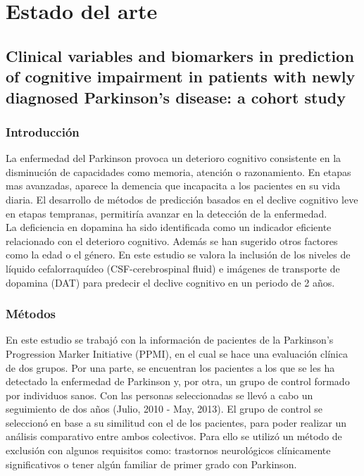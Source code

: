\chapter{Estado del arte}



\section{Clinical variables and biomarkers in prediction of cognitive impairment in patients with newly diagnosed Parkinson’s disease: a cohort study}


	\subsection{Introducción}
	
	La enfermedad del Parkinson provoca un deterioro cognitivo consistente en la disminución de capacidades como memoria, atención o razonamiento. En etapas mas avanzadas, aparece la demencia que incapacita a los pacientes en su vida diaria. El desarrollo de métodos de predicción basados en el declive cognitivo leve en etapas tempranas, permitiría avanzar en la detección de la enfermedad. \\
	
	
	La deficiencia en dopamina ha sido identificada como un indicador eficiente relacionado con el deterioro cognitivo. Además se han sugerido otros factores como la edad o el género. En este estudio se valora la inclusión de los niveles de líquido cefalorraquídeo (CSF-cerebrospinal fluid) e imágenes de transporte de dopamina (DAT) para predecir el declive cognitivo en un periodo de 2 años.
	
	\subsection{Métodos}
	En este estudio se trabajó con la información de pacientes de la Parkinson’s Progression Marker Initiative (PPMI), en el cual se hace una evaluación clínica de dos grupos. Por una parte, se encuentran los pacientes a los que se les ha detectado la enfermedad de Parkinson y, por otra, un grupo de control formado por individuos sanos. Con las personas seleccionadas se llevó a cabo un seguimiento de dos años (Julio, 2010 - May, 2013). El grupo de control se seleccionó en base a su similitud con el de los pacientes, para poder realizar un análisis comparativo entre ambos colectivos. Para ello se utilizó un método de exclusión con algunos requisitos como: trastornos neurológicos clínicamente significativos o tener algún familiar de primer grado con Parkinson.\\
	
